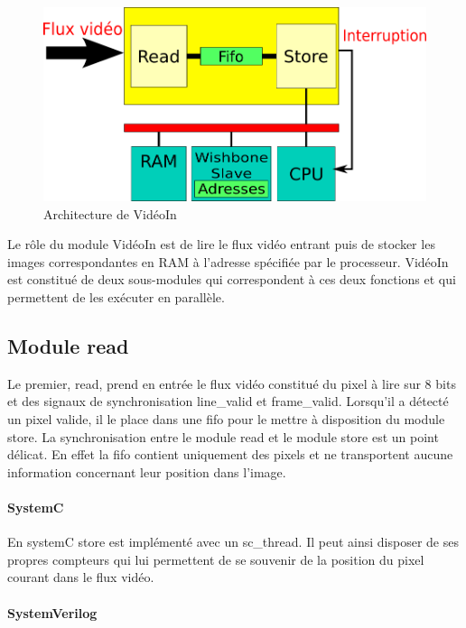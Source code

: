 \documentclass[a4paper,12pt]{report}
\begin{document}
\begin{figure}[!h]
	\centering
	\includegraphics[scale = 0.5]{video_in.png}
	\caption{Architecture de VidéoIn}
\end{figure}

Le rôle du module VidéoIn est de lire le flux vidéo entrant puis de stocker les images correspondantes en RAM à l'adresse spécifiée par le processeur.
VidéoIn est constitué de deux sous-modules qui correspondent à ces deux fonctions et qui permettent de les exécuter en parallèle. 


\subsection*{Module read}
Le premier, read, prend en entrée le flux vidéo constitué du pixel à lire sur 8 bits et des signaux de synchronisation line\_valid et frame\_valid.
Lorsqu'il a détecté un pixel valide, il le place dans une fifo pour le mettre à disposition du module store.
La synchronisation entre le module read et le module store est un point délicat. 
En effet la fifo contient uniquement des pixels et ne transportent aucune information concernant leur position dans l'image. 

\paragraph*{SystemC}
En systemC store est implémenté avec un sc\_thread. Il peut ainsi disposer de ses propres compteurs qui lui permettent de se souvenir de la position
du pixel courant dans le flux vidéo.

\paragraph*{SystemVerilog}
\end{document}
